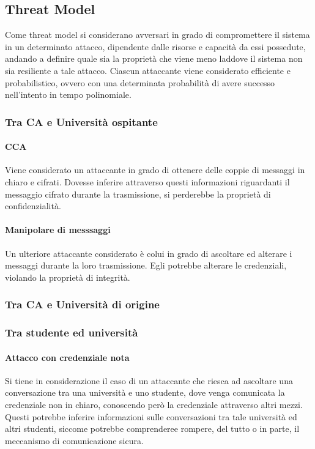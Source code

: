 \documentclass[a4paper,12pt]{article}
\begin{document}
\subsection{Threat Model}
Come threat model si considerano avversari in grado di compromettere il sistema in un determinato attacco, dipendente dalle risorse e capacità da essi possedute, andando a definire quale sia la proprietà che viene meno laddove il sistema non sia resiliente a tale attacco.
\newline Ciascun attaccante viene considerato efficiente e probabilistico, ovvero con una determinata probabilità di avere successo nell'intento in tempo polinomiale.
\subsubsection{Tra CA e Università ospitante}
\paragraph{CCA} Viene considerato un attaccante in grado di ottenere delle coppie di messaggi in chiaro e cifrati. Dovesse inferire attraverso questi informazioni riguardanti il messaggio cifrato durante la trasmissione, si perderebbe la proprietà di confidenzialità.
\paragraph{Manipolare di messsaggi} Un ulteriore attaccante considerato è colui in grado di ascoltare ed alterare i messaggi durante la loro trasmissione. Egli potrebbe alterare le credenziali, violando la proprietà di integrità. 
\subsubsection{Tra CA e Università di origine}
\subsubsection{Tra studente ed università}
\paragraph{Attacco con credenziale nota} Si tiene in considerazione il caso di un attaccante che riesca ad ascoltare una conversazione tra una università e uno studente, dove venga comunicata la credenziale non in chiaro, conoscendo però la credenziale attraverso altri mezzi. Questi potrebbe inferire informazioni sulle conversazioni tra tale università ed altri studenti, siccome potrebbe comprenderee rompere, del tutto o in parte, il meccanismo di comunicazione sicura.
\end{document}
